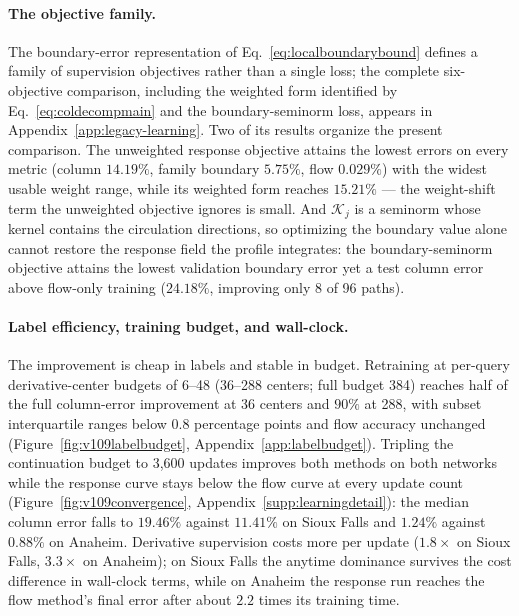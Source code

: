 \paragraph{The objective family.}
The boundary-error representation of
Eq.~\eqref{eq:localboundarybound} defines a family of supervision
objectives rather than a single loss; the complete six-objective
comparison, including the weighted form identified by
Eq.~\eqref{eq:coldecompmain} and the boundary-seminorm loss, appears
in Appendix~\ref{app:legacy-learning}. Two of its results organize the
present comparison. The unweighted response objective attains the
lowest errors on every metric (column $14.19\%$, family boundary
$5.75\%$, flow $0.029\%$) with the widest usable weight range, while
its weighted form reaches $15.21\%$ --- the weight-shift term the
unweighted objective ignores is small. And $\mathcal K_j$ is a seminorm
whose kernel contains the circulation directions, so optimizing the
boundary value alone cannot restore the response field the profile
integrates: the boundary-seminorm objective attains the lowest
validation boundary error yet a test column error above flow-only
training ($24.18\%$, improving only 8 of 96 paths).

\paragraph{Label efficiency, training budget, and wall-clock.}
The improvement is cheap in labels and stable in budget. Retraining at
per-query derivative-center budgets of 6--48 (36--288 centers; full
budget 384) reaches half of the full column-error improvement at 36
centers and $90\%$ at 288, with subset interquartile ranges below
$0.8$ percentage points and flow accuracy unchanged
(Figure~\ref{fig:v109labelbudget}, Appendix~\ref{app:labelbudget}).
Tripling the continuation budget to 3{,}600 updates improves both
methods on both networks while the response curve stays below the flow
curve at every update count (Figure~\ref{fig:v109convergence},
Appendix~\ref{supp:learningdetail}): the median column error falls to
$19.46\%$ against $11.41\%$ on Sioux Falls and $1.24\%$ against
$0.88\%$ on Anaheim. Derivative supervision costs more per update
($1.8\times$ on Sioux Falls, $3.3\times$ on Anaheim); on Sioux Falls
the anytime dominance survives the cost difference in wall-clock
terms, while on Anaheim the response run reaches the flow method's
final error after about $2.2$ times its training time.

